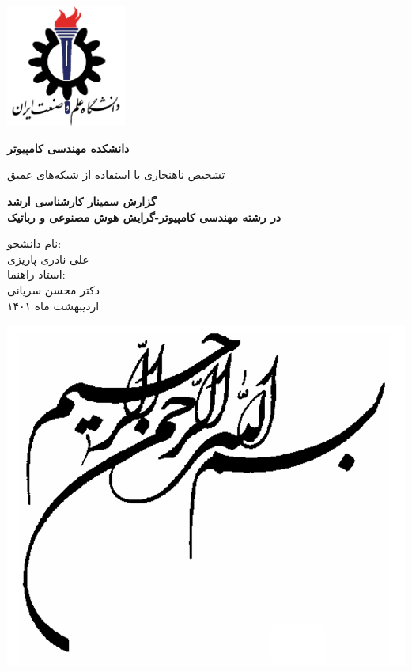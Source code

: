 \documentclass[12pt,a4paper]{report}
\theoremstyle{definition}
\theoremstyle{theorem}
\theoremstyle{definition}
\begin{document}
	\thispagestyle{empty}
	\vspace*{25mm}
	\centerline{\includegraphics[height=4cm]{./images/logos/iust.png}}

	\begin{center}
	\textbf{
		دانشکده مهندسی کامپیوتر
	}
	\\[1cm]
	\baselineskip=2cm
	{\titr
	\begin{Huge}
	تشخیص ناهنجاری با استفاده از شبکه‌های عمیق\\[1cm]
	\end{Huge}}
	{\Large 
		\textbf{
			گزارش سمینار کارشناسی ارشد\\
			در رشته مهندسی کامپیوتر-گرایش هوش مصنوعی و رباتیک
		} \\[1cm]
	}

	{\Large { 
	نام دانشجو:
	}
	\\
	{\Large  علی نادری پاریزی }
	\\[.5cm]
	{\Large  
		استاد راهنما:
	}
	\\
	{\Large دکتر محسن سریانی}
	\\[.6cm]
	}
	اردیبهشت ماه ۱۴۰۱
	\end{center}

	\newpage
		\begin{center}
		\includegraphics[scale=1]{./images/god.png}
		\end{center}
	\newpage
	
\end{document}
